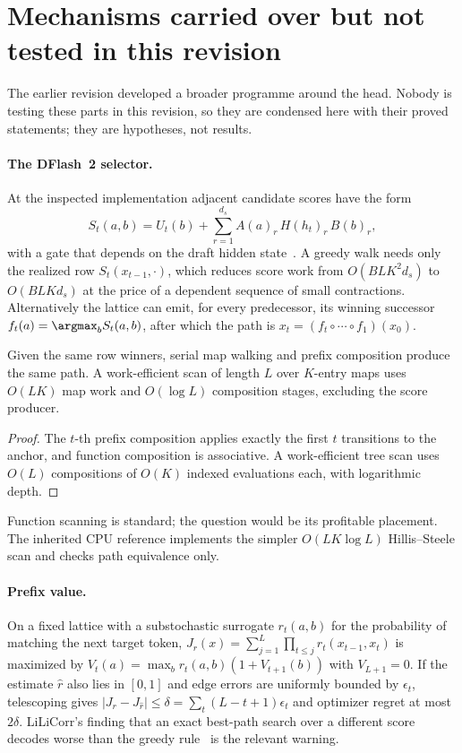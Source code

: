 \section{Mechanisms carried over but not tested in this revision}\label{app:untested}
The earlier revision developed a broader programme around the head. Nobody is testing these parts in this revision, so they are condensed here with their proved statements; they are hypotheses, not results.

\paragraph{The DFlash~2 selector.} At the inspected implementation adjacent candidate scores have the form
\begin{equation}
S_t(a,b)=U_t(b)+\sum_{r=1}^{d_s}A(a)_r\,H(h_t)_r\,B(b)_r,\label{eq:selector}
\end{equation}
with a gate that depends on the draft hidden state~\cite{dflash,sgcode}. A greedy walk needs only the realized row $S_t(x_{t-1},\cdot)$, which reduces score work from $O(BLK^2d_s)$ to $O(BLKd_s)$ at the price of a dependent sequence of small contractions. Alternatively the lattice can emit, for every predecessor, its winning successor $f_t(a)=\argmax_bS_t(a,b)$, after which the path is $x_t=(f_t\circ\cdots\circ f_1)(x_0)$.

\begin{proposition}\label{prop:maps}
Given the same row winners, serial map walking and prefix composition produce the same path. A work-efficient scan of length $L$ over $K$-entry maps uses $O(LK)$ map work and $O(\log L)$ composition stages, excluding the score producer.
\end{proposition}
\begin{proof}
The $t$-th prefix composition applies exactly the first $t$ transitions to the anchor, and function composition is associative. A work-efficient tree scan uses $O(L)$ compositions of $O(K)$ indexed evaluations each, with logarithmic depth.
\end{proof}
Function scanning is standard; the question would be its profitable placement. The inherited CPU reference implements the simpler $O(LK\log L)$ Hillis--Steele scan and checks path equivalence only.

\paragraph{Prefix value.} On a fixed lattice with a substochastic surrogate $r_t(a,b)$ for the probability of matching the next target token, $J_r(x)=\sum_{j=1}^{L}\prod_{t\le j}r_t(x_{t-1},x_t)$ is maximized by $V_t(a)=\max_br_t(a,b)(1+V_{t+1}(b))$ with $V_{L+1}=0$. If the estimate $\hat r$ also lies in $[0,1]$ and edge errors are uniformly bounded by $\epsilon_t$, telescoping gives $|J_r-J_{\hat r}|\le\delta=\sum_t(L-t+1)\epsilon_t$ and optimizer regret at most $2\delta$. LiLiCorr's finding that an exact best-path search over a different score decodes worse than the greedy rule~\cite{lilicorr} is the relevant warning.

